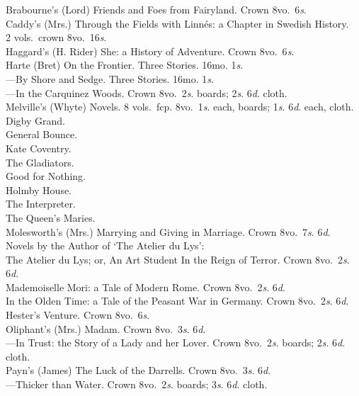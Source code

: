 \documentclass[letterpaper,12pt,oneside,openany]{memoir}
\newcommand{\D}{\hspace*{5mm}}
\newcommand{\E}{\hspace*{2mm}---\hspace*{2mm}}
\begin{document}
\begin{footnotesize}
Brabourne's (Lord) Friends and Foes from Fairyland. Crown 8vo.\ 6\textit{s}.\\
Caddy's (Mrs.) Through the Fields with Linn{\'e}s: a Chapter in Swedish History.\\
\D 2 vols.\ crown 8vo.\ 16\textit{s}.\\
Haggard's (H. Rider) She: a History of Adventure. Crown 8vo.\ 6\textit{s}.\\
Harte (Bret) On the Frontier. Three Stories. 16mo. 1\textit{s}.\\
\E By Shore and Sedge. Three Stories. 16mo. 1\textit{s}.\\
\E In the Carquinez Woods. Crown 8vo.\ 2\textit{s}. boards; 2\textit{s}. 6\textit{d}. cloth.\\
Melville's (Whyte) Novels. 8 vols.\ fcp. 8vo.\ 1\textit{s}. each, boards; 1\textit{s}. 6\textit{d}. each, cloth.\\
\D Digby Grand.\\
\D General Bounce.\\
\D Kate Coventry.\\
\D The Gladiators.\\
\D Good for Nothing.\\
\D Holmby House.\\
\D The Interpreter.\\
\D The Queen's Maries.\\
Molesworth's (Mrs.) Marrying and Giving in Marriage. Crown 8vo.\ 7\textit{s}. 6\textit{d}.\\
Novels by the Author of `The Atelier du Lys':\\
\D The Atelier du Lys; or, An Art Student In the Reign of Terror. Crown 8vo.\ 2\textit{s}. 6\textit{d}.\\
\D Mademoiselle Mori: a Tale of Modern Rome. Crown 8vo.\ 2\textit{s}. 6\textit{d}.\\
\D In the Olden Time: a Tale of the Peasant War in Germany. Crown 8vo.\ 2\textit{s}. 6\textit{d}.\\
\D Hester's Venture. Crown 8vo.\ 6\textit{s}.\\
Oliphant's (Mrs.) Madam. Crown 8vo.\ 3\textit{s}. 6\textit{d}.\\
\E In Trust: the Story of a Lady and her Lover. Crown 8vo.\ 2\textit{s}. boards; 2\textit{s}. 6\textit{d}. cloth.\\
Payn's (James) The Luck of the Darrells. Crown 8vo.\ 3\textit{s}. 6\textit{d}.\\
\E Thicker than Water. Crown 8vo.\ 2\textit{s}. boards; 3\textit{s}. 6\textit{d}. cloth.\\

\end{footnotesize}
\end{document}
